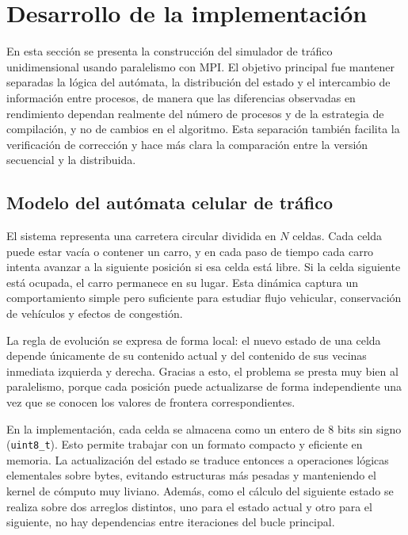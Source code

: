 
\section{Desarrollo de la implementación}

En esta sección se presenta la construcción del simulador de tráfico unidimensional usando paralelismo con MPI. El objetivo principal fue mantener separadas la lógica del autómata, la distribución del estado y el intercambio de información entre procesos, de manera que las diferencias observadas en rendimiento dependan realmente del número de procesos y de la estrategia de compilación, y no de cambios en el algoritmo. Esta separación también facilita la verificación de corrección y hace más clara la comparación entre la versión secuencial y la distribuida.

\subsection{Modelo del autómata celular de tráfico}

El sistema representa una carretera circular dividida en $N$ celdas. Cada celda puede estar vacía o contener un carro, y en cada paso de tiempo cada carro intenta avanzar a la siguiente posición si esa celda está libre. Si la celda siguiente está ocupada, el carro permanece en su lugar. Esta dinámica captura un comportamiento simple pero suficiente para estudiar flujo vehicular, conservación de vehículos y efectos de congestión.

La regla de evolución se expresa de forma local: el nuevo estado de una celda depende únicamente de su contenido actual y del contenido de sus vecinas inmediata izquierda y derecha. Gracias a esto, el problema se presta muy bien al paralelismo, porque cada posición puede actualizarse de forma independiente una vez que se conocen los valores de frontera correspondientes.

En la implementación, cada celda se almacena como un entero de 8 bits sin signo (\texttt{uint8\_t}). Esto permite trabajar con un formato compacto y eficiente en memoria. La actualización del estado se traduce entonces a operaciones lógicas elementales sobre bytes, evitando estructuras más pesadas y manteniendo el kernel de cómputo muy liviano. Además, como el cálculo del siguiente estado se realiza sobre dos arreglos distintos, uno para el estado actual y otro para el siguiente, no hay dependencias entre iteraciones del bucle principal.

